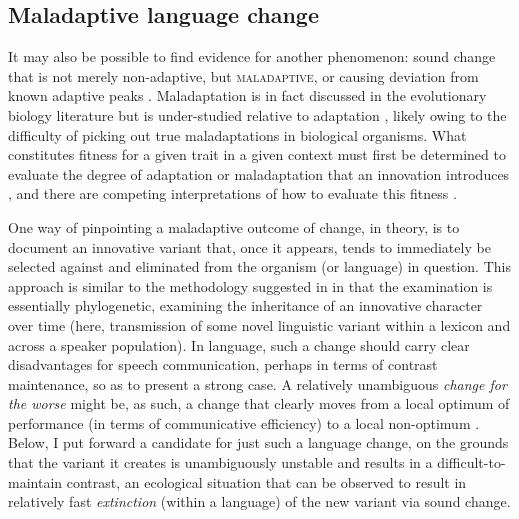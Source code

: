 \documentclass[output=paper,hidelinks]{langscibook}
\begin{document}
\subsection{Maladaptive language change}

%
It may also be possible to find evidence for another phenomenon: sound change that is not merely non-adaptive, but \textsc{maladaptive}, or causing deviation from known adaptive peaks \citep{schluter-nychka, crespi}.
%
Maladaptation is in fact discussed in the evolutionary biology literature but is under-studied relative to adaptation \citep{brady-etal}, likely owing to the difficulty of picking out true maladaptations in biological organisms. What constitutes fitness for a given trait in a given context must first be determined to evaluate the degree of adaptation or maladaptation that an innovation introduces \citep{lewontin, crespi}, and there are competing interpretations of how to evaluate this fitness \citep{hendry-gonzalez}.


One way of pinpointing a maladaptive outcome of change, in theory, is to document an innovative variant that, once it appears, tends to immediately be selected against and eliminated from the organism (or language) in question. This approach is similar to the methodology suggested in \citet{baum-larson} in that the examination is essentially phylogenetic, examining the inheritance of an innovative character over time (here, transmission of some novel linguistic variant within a lexicon and across a speaker population). In language, such a change should carry clear disadvantages for speech communication, perhaps in terms of contrast maintenance, so as to present a strong case.
%
A relatively unambiguous \textit{change for the worse} might be, as such, a change that clearly moves from a local optimum of performance (in terms of communicative efficiency) to a local non-optimum \citep{crespi}. Below, I put forward a candidate for just such a language change, on the grounds that the variant it creates is unambiguously unstable and results in a difficult-to-maintain contrast, an ecological situation that can be observed to result in relatively fast \textit{extinction} (within a language) of the new variant via sound change.
\end{document}
